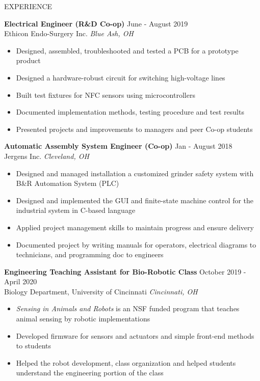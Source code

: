 \documentclass{../lib/resume} %
\begin{document}
\begin{rSection}{EXPERIENCE}

    \textbf{Electrical Engineer (R\&D Co-op)} \hfill June - August 2019\\
    Ethicon Endo-Surgery Inc. \hfill \textit{Blue Ash, OH}
    \begin{itemize}
        \itemsep -4pt {}
        \item Designed, assembled, troubleshooted and tested a PCB for a prototype product
        \item Designed a hardware-robust circuit for switching high-voltage lines
        \item Built test fixtures for NFC sensors using microcontrollers
        \item Documented implementation methods, testing procedure and test results
        \item Presented projects and improvements to managers and peer Co-op students
    \end{itemize}

    \textbf{Automatic Assembly System Engineer (Co-op)} \hfill Jan - August 2018
    \\	Jergens Inc. \hfill \textit{Cleveland, OH}
    \begin{itemize}
        \itemsep -4pt {}
        \item Designed and managed installation a customized grinder safety system with B\&R Automation System (PLC)
        \item Designed and implemented the GUI and finite-state machine control for the industrial system in C-based language
        \item Applied project management skills to maintain progress and ensure delivery
        \item Documented project by writing manuals for operators, electrical diagrams to technicians, and programming doc to engineers
    \end{itemize}


    \textbf{Engineering Teaching Assistant for Bio-Robotic Class} \hfill October 2019 - April 2020\\
    Biology Department, University of Cincinnati \hfill \textit{Cincinnati, OH}
    \begin{itemize}
        \itemsep -4pt {}
        \item \textit{Sensing in Animals and Robots} is an NSF funded program that teaches animal sensing by robotic implementations
        \item Developed firmware for sensors and actuators and simple front-end methods to students
        \item Helped the robot development, class organization and helped students understand the engineering portion of the class

    \end{itemize}
\end{rSection}
\end{document}

